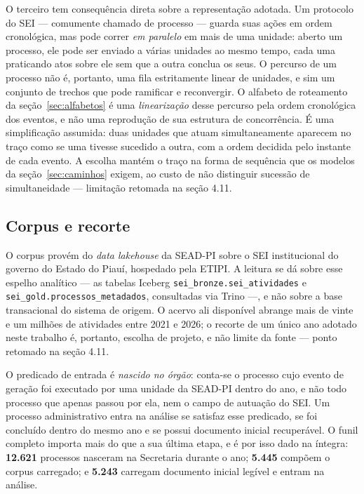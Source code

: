 O terceiro tem consequência direta sobre a representação adotada. Um protocolo do SEI ---
comumente chamado de processo --- guarda suas ações em ordem cronológica, mas pode correr
\emph{em paralelo} em mais de uma unidade: aberto um processo, ele pode ser enviado a várias
unidades ao mesmo tempo, cada uma praticando atos sobre ele sem que a outra conclua os seus. O
percurso de um processo não é, portanto, uma fila estritamente linear de unidades, e sim um
conjunto de trechos que pode ramificar e reconvergir. O alfabeto de roteamento da
seção~\ref{sec:alfabetos} é uma \emph{linearização} desse percurso pela ordem cronológica dos
eventos, e não uma reprodução de sua estrutura de concorrência. É uma simplificação assumida:
duas unidades que atuam simultaneamente aparecem no traço como se uma tivesse sucedido a outra,
com a ordem decidida pelo instante de cada evento. A escolha mantém o traço na forma de sequência
que os modelos da seção~\ref{sec:caminhos} exigem, ao custo de não distinguir sucessão de
simultaneidade --- limitação retomada na seção 4.11.

\subsection{Corpus e recorte}\label{sec:corpus}

O corpus provém do \emph{data lakehouse} da SEAD-PI sobre o SEI institucional do governo do
Estado do Piauí, hospedado pela ETIPI. A leitura se dá sobre esse espelho analítico --- as tabelas
Iceberg \texttt{sei\_bronze.sei\_atividades} e \texttt{sei\_gold.processos\_metadados}, consultadas
via Trino ---, e não sobre a base transacional do sistema de origem. O acervo ali disponível abrange
mais de vinte e um milhões de atividades entre 2021 e 2026; o recorte de um único ano adotado neste
trabalho é, portanto, escolha de projeto, e não limite da fonte --- ponto retomado na seção 4.11.

O predicado de entrada é \emph{nascido no órgão}: conta-se o processo
cujo evento de geração foi executado por uma unidade da SEAD-PI dentro do ano, e não todo processo
que apenas passou por ela, nem o campo de autuação do SEI. Um processo administrativo entra na
análise se satisfaz esse predicado, se foi concluído dentro do mesmo ano e se possui documento
inicial recuperável. O funil completo importa mais do que a sua última etapa, e é por isso dado
na íntegra: \textbf{12.621} processos nasceram na Secretaria durante o ano; \textbf{5.445}
compõem o corpus carregado; e \textbf{5.243} carregam documento inicial legível e entram na análise.

